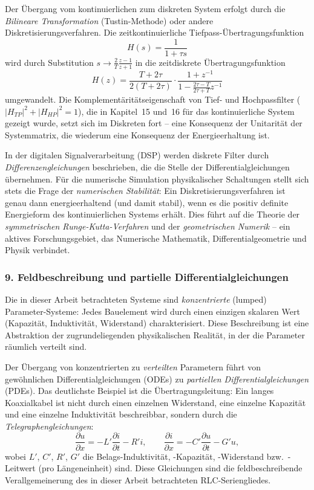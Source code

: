 ﻿\documentclass[12pt, a4paper]{article}
\begin{document}
	Der Übergang vom kontinuierlichen zum diskreten System erfolgt durch die \textit{Bilineare Transformation} (Tustin-Methode) oder andere Diskretisierungsverfahren. Die zeitkontinuierliche Tiefpass-Übertragungsfunktion
	\begin{equation}
		H(s) = \frac{1}{1 + \tau s}
	\end{equation}
	wird durch Substitution $s \to \frac{2}{T}\frac{z - 1}{z + 1}$ in die zeitdiskrete Übertragungsfunktion
	\begin{equation}
		H(z) = \frac{T + 2\tau}{2(T + 2\tau)} \cdot \frac{1 + z^{-1}}{1 - \frac{2\tau - T}{2\tau + T} z^{-1}}
	\end{equation}
	umgewandelt. Die Komplementäritätseigenschaft von Tief- und Hochpassfilter ($|H_{TP}|^2 + |H_{HP}|^2 = 1$), die in Kapitel~15 und~16 für das kontinuierliche System gezeigt wurde, setzt sich im Diskreten fort -- eine Konsequenz der Unitarität der Systemmatrix, die wiederum eine Konsequenz der Energieerhaltung ist.

	In der digitalen Signalverarbeitung (DSP) werden diskrete Filter durch \textit{Differenzengleichungen} beschrieben, die die Stelle der Differentialgleichungen übernehmen. Für die numerische Simulation physikalischer Schaltungen stellt sich stets die Frage der \textit{numerischen Stabilität}: Ein Diskre\-tisierungsverfahren ist genau dann energieerhaltend (und damit stabil), wenn es die positiv definite Energieform des kontinuierlichen Systems erhält. Dies führt auf die Theorie der \textit{symmetrischen Runge-Kutta-Verfahren} und der \textit{geometrischen Numerik} -- ein aktives Forschungsgebiet, das Numerische Mathematik, Differential\-geometrie und Physik verbindet.

	\subsubsection*{9. \quad Feldbeschreibung und partielle Differentialgleichungen}

	Die in dieser Arbeit betrachteten Systeme sind \textit{konzentrierte} (lumped) Parameter-Systeme: Jedes Bauelement wird durch einen einzigen skalaren Wert (Kapazität, Induktivität, Widerstand) charakterisiert. Diese Beschreibung ist eine Abstraktion der zugrundeliegenden physikalischen Realität, in der die Parameter räumlich verteilt sind.

	Der Übergang von konzentrierten zu \textit{verteilten} Parametern führt von gewöhnlichen Differentialgleichungen (ODEs) zu \textit{partiellen Differentialgleichungen} (PDEs). Das deutlichste Beispiel ist die Übertragungsleitung: Ein langes Koaxialkabel ist nicht durch einen einzelnen Widerstand, eine einzelne Kapazität und eine einzelne Induktivität beschreibbar, sondern durch die \textit{Telegraphengleichungen}:
	\begin{equation}
		\frac{\partial u}{\partial x} = -L'\frac{\partial i}{\partial t} - R'i, \qquad \frac{\partial i}{\partial x} = -C'\frac{\partial u}{\partial t} - G'u,
	\end{equation}
	wobei $L'$, $C'$, $R'$, $G'$ die Belags-Induktivität, -Kapazität, -Widerstand bzw.\ -Leitwert (pro Längeneinheit) sind. Diese Gleichungen sind die feldbeschreibende Verallgemeinerung des in dieser Arbeit betrachteten RLC-Seriengliedes.
\end{document}
